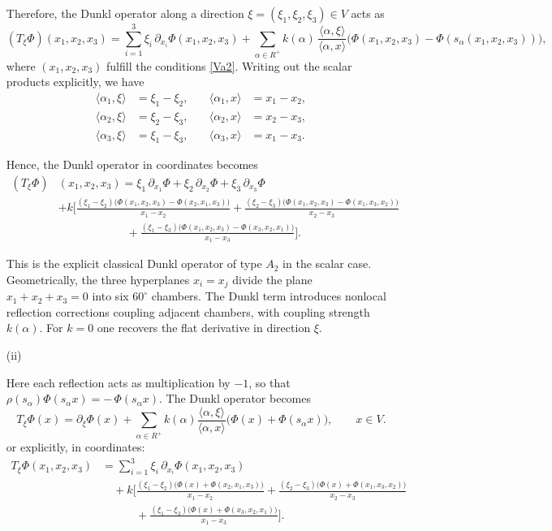 \documentclass[12pt]{article}
\newcommand{\1}{\mathbbm{1}}
\theoremstyle{definition}
\begin{document}
\begin{itemize}
Therefore, the Dunkl operator along a direction $\xi=(\xi_1,\xi_2,\xi_3)\in V$ acts as
\[
  (T_\xi \Phi)(x_1,x_2,x_3)
  = \sum_{i=1}^3 \xi_i\,\partial_{x_i}\Phi(x_1,x_2,x_3)
  + \sum_{\alpha\in R^+} k(\alpha)\,
    \frac{\langle \alpha,\xi\rangle}{\langle \alpha,x\rangle}
    \Big(\Phi(x_1,x_2,x_3)-\Phi(s_\alpha(x_1,x_2,x_3))\Big),
\]
where $(x_1,x_2,x_3)$ fulfill the conditions \eqref{Va2}. Writing out the scalar products explicitly, we have
\[
\begin{aligned}
  \langle \alpha_1,\xi\rangle &= \xi_1-\xi_2, & \quad
  \langle \alpha_1,x\rangle &= x_1-x_2,\\
  \langle \alpha_2,\xi\rangle &= \xi_2-\xi_3, & \quad
  \langle \alpha_2,x\rangle &= x_2-x_3,\\
  \langle \alpha_3,\xi\rangle &= \xi_1-\xi_3, & \quad
  \langle \alpha_3,x\rangle &= x_1-x_3.
\end{aligned}
\]

Hence, the Dunkl operator in coordinates becomes
\[
\begin{aligned}
  (T_\xi \Phi) & (x_1,x_2,x_3)
  = \xi_1\,\partial_{x_1}\Phi
   + \xi_2\,\partial_{x_2}\Phi
   + \xi_3\,\partial_{x_3}\Phi \\
  & + k\Bigg[
     \frac{(\xi_1-\xi_2)\big(\Phi(x_1,x_2,x_3)-\Phi(x_2,x_1,x_3)\big)}{x_1-x_2}
     + \frac{(\xi_2-\xi_3)\big(\Phi(x_1,x_2,x_3)-\Phi(x_1,x_3,x_2)\big)}{x_2-x_3}\\
  &\qquad\quad \qquad\quad
     + \frac{(\xi_1-\xi_3)\big(\Phi(x_1,x_2,x_3)-\Phi(x_3,x_2,x_1)\big)}{x_1-x_3}
   \Bigg].
\end{aligned}
\]

This is the explicit classical Dunkl operator of type $A_2$ in the scalar case.  
Geometrically, the three hyperplanes $x_i = x_j$ divide the plane
$x_1+x_2+x_3=0$ into six $60^\circ$ chambers. The Dunkl term introduces
nonlocal reflection corrections coupling adjacent chambers, with coupling
strength $k(\alpha)$. For $k=0$ one recovers the flat derivative in direction $\xi$.


\item[(ii)] 

Here each reflection acts as multiplication by $-1$, so that
$\rho(s_\alpha)\Phi(s_\alpha x) = -\,\Phi(s_\alpha x)$. The Dunkl operator becomes
\[
  T_\xi \Phi(x)
  = \partial_\xi \Phi(x)
  + \sum_{\alpha\in R^+} k(\alpha)
     \frac{\langle \alpha,\xi\rangle}{\langle \alpha,x\rangle}
     \big(\Phi(x) + \Phi(s_\alpha x)\big), \qquad x\in V.
\]
or explicitly, in coordinates:
\[
\begin{aligned}
T_\xi \Phi(x_1,x_2,x_3)
  &= \sum_{i=1}^3 \xi_i\,\partial_{x_i}\Phi(x_1,x_2,x_3) \\
  &\quad+ k\Bigg[
     \frac{(\xi_1-\xi_2)\big(\Phi(x)+\Phi(x_2,x_1,x_3)\big)}{x_1-x_2}
     + \frac{(\xi_2-\xi_3)\big(\Phi(x)+\Phi(x_1,x_3,x_2)\big)}{x_2-x_3}\\
  &\qquad\quad
     + \frac{(\xi_1-\xi_3)\big(\Phi(x)+\Phi(x_3,x_2,x_1)\big)}{x_1-x_3}
     \Bigg].
\end{aligned}
\]



\end{itemize}
\end{document}
